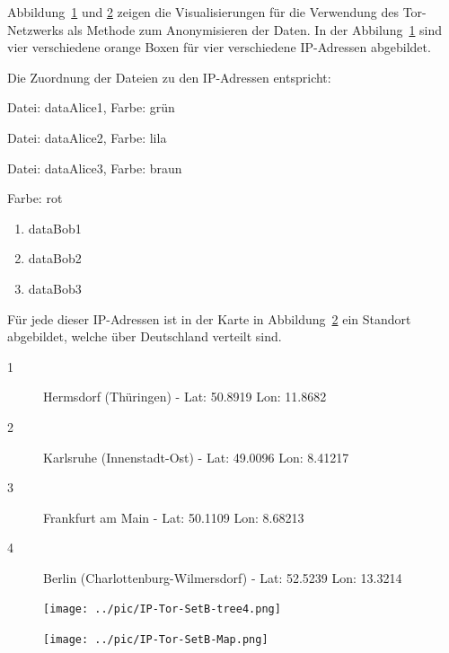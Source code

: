 \documentclass[
    fontsize=12pt,
    headings=small,
    parskip=half,           %
    bibliography=totoc,
    numbers=noenddot,       %
    open=any,               %
    ]{scrreprt}
\begin{document}
Abbildung~\ref{fig:TIpTM} und \ref{fig:TIpM} zeigen die Visualisierungen für die Verwendung des Tor-Netzwerks als Methode zum Anonymisieren der Daten.
In der Abbilung~\ref{fig:TIpTM} sind vier verschiedene orange Boxen für vier verschiedene IP-Adressen abgebildet.

Die Zuordnung der Dateien zu den IP-Adressen entspricht:
\begin{description}[style=nextline]
\item[203.0.113.1] Datei: dataAlice1, Farbe: grün
\item[203.113.5] Datei: dataAlice2, Farbe: lila
\item[203.0.113.13] Datei: dataAlice3, Farbe: braun
\item[203.0.113.2] Farbe: rot
\begin{enumerate}
\item dataBob1
\item dataBob2
\item dataBob3
\end{enumerate}
\end{description}

Für jede dieser IP-Adressen ist in der Karte in Abbildung~\ref{fig:TIpM} ein Standort abgebildet, welche über Deutschland verteilt sind. 
\begin{description}
\item[1] Hermsdorf (Thüringen) - Lat: 50.8919 Lon: 11.8682
\item[2] Karlsruhe (Innenstadt-Ost) - Lat: 49.0096 Lon: 8.41217
\item[3] Frankfurt am Main - Lat: 50.1109 Lon: 8.68213
\item[4] Berlin (Charlottenburg-Wilmersdorf) - Lat: 52.5239 Lon: 13.3214
\end{description}

\begin{figure}[H]
\texttt{[image: ../pic/IP-Tor-SetB-tree4.png]}
\label{fig:TIpTM}
\end{figure}

\begin{figure}[H]
\texttt{[image: ../pic/IP-Tor-SetB-Map.png]}
\label{fig:TIpM}
\end{figure}
\end{document}
